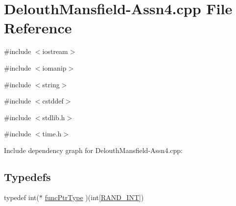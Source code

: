 \hypertarget{_delouth_mansfield-_assn4_8cpp}{
\section{DelouthMansfield-\/Assn4.cpp File Reference}
\label{_delouth_mansfield-_assn4_8cpp}
}
{\ttfamily \#include $<$iostream$>$}\par
{\ttfamily \#include $<$iomanip$>$}\par
{\ttfamily \#include $<$string$>$}\par
{\ttfamily \#include $<$cstddef$>$}\par
{\ttfamily \#include $<$stdlib.h$>$}\par
{\ttfamily \#include $<$time.h$>$}\par
Include dependency graph for DelouthMansfield-\/Assn4.cpp:\subsection*{Typedefs}
\begin{DoxyCompactItemize}
\item 
typedef int($\ast$ \hyperlink{_delouth_mansfield-_assn4_8cpp_ae2987d0004dea58df8c833858c0fb370}{funcPtrType} )(int\mbox{[}\hyperlink{_delouth_mansfield-_assn4_8cpp_a134c2ba56ae9ba89c77a5c0dba9f2124}{RAND\_\-INT}\mbox{]})
\end{DoxyCompactItemize}
